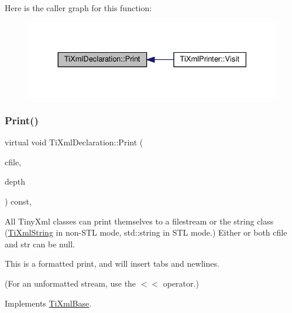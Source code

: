 Here is the caller graph for this function\+:\nopagebreak
\begin{figure}[H]
\begin{center}
\leavevmode
\includegraphics[width=330pt]{class_ti_xml_declaration_ace687d02a5a25a060ae3802abb1b3f55_icgraph}
\end{center}
\end{figure}
\mbox{\label{class_ti_xml_declaration_ae46cff6565f299210ab945e78bf28514}} 
\subsubsection{\texorpdfstring{Print()}{Print()}\hspace{0.1cm}{\footnotesize\ttfamily [2/2]}}
{\footnotesize\ttfamily virtual void Ti\+Xml\+Declaration\+::\+Print (\begin{DoxyParamCaption}\item[{F\+I\+LE $\ast$}]{cfile,  }\item[{int}]{depth }\end{DoxyParamCaption}) const\hspace{0.3cm}{\ttfamily [inline]}, {\ttfamily [virtual]}}

All Tiny\+Xml classes can print themselves to a filestream or the string class (\hyperlink{class_ti_xml_string}{Ti\+Xml\+String} in non-\/\+S\+TL mode, std\+::string in S\+TL mode.) Either or both cfile and str can be null.

This is a formatted print, and will insert tabs and newlines.

(For an unformatted stream, use the $<$$<$ operator.) 

Implements \hyperlink{class_ti_xml_base_a0de56b3f2ef14c65091a3b916437b512}{Ti\+Xml\+Base}.

\mbox{\label{class_ti_xml_declaration_a1f2f8a741593d15a61e491e5024cacef}} 

